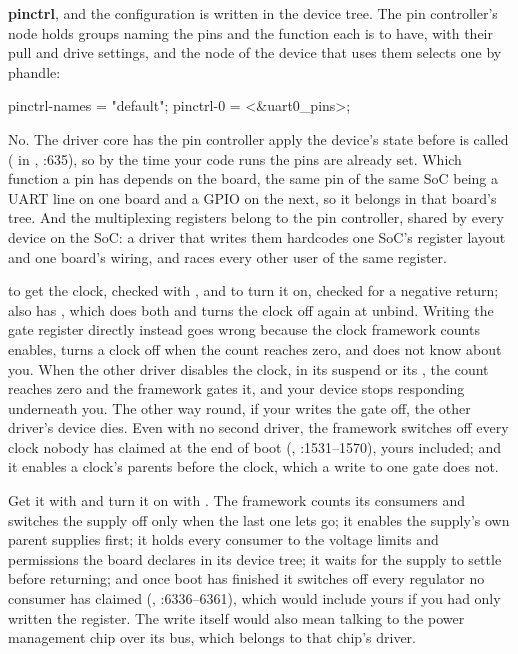  \textbf{pinctrl}, and the configuration is written in the device tree. The pin
controller's node holds groups naming the pins and the function each is to have, with their pull
and drive settings, and the node of the device that uses them selects one by phandle:

\begin{console}
pinctrl-names = "default";
pinctrl-0 = <&uart0_pins>;
\end{console}

 No. The driver core has the pin controller apply the device's  state before
 is called ( in ,
:635), so by the time your code runs the pins are already set. Which
function a pin has depends on the board, the same pin of the same SoC being a UART line on one
board and a GPIO on the next, so it belongs in that board's tree. And the multiplexing registers
belong to the pin controller, shared by every device on the SoC: a driver that writes them
hardcodes one SoC's register layout and one board's wiring, and races every other user of the same
register.

  to get the clock, checked with , and
 to turn it on, checked for a negative return;
 also has , which does both and turns the clock
off again at unbind. Writing the gate register directly instead goes wrong because the clock
framework counts enables, turns a clock off when the count reaches zero, and does not know about
you. When the other driver disables the clock, in its suspend or its , the count
reaches zero and the framework gates it, and your device stops responding underneath you. The
other way round, if your  writes the gate off, the other driver's device dies. Even
with no second driver, the framework switches off every clock nobody has claimed at the end of boot
(, :1531--1570), yours included; and it enables a
clock's parents before the clock, which a write to one gate does not.

 Get it with  and turn it on with . The
framework counts its consumers and switches the supply off only when the last one lets go; it
enables the supply's own parent supplies first; it holds every consumer to the voltage limits and
permissions the board declares in its device tree; it waits for the supply to settle before
returning; and once boot has finished it switches off every regulator no consumer has claimed
(, :6336--6361), which would include
yours if you had only written the register. The write itself would also mean talking to the power
management chip over its bus, which belongs to that chip's driver.

